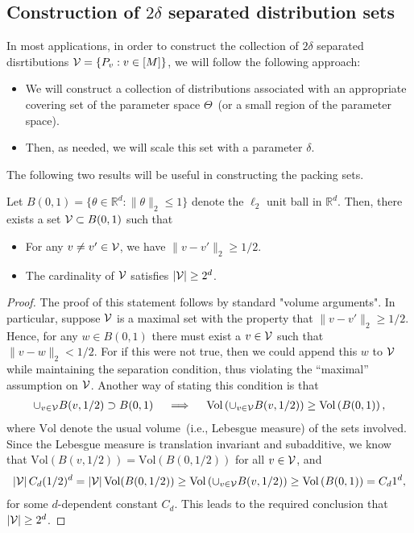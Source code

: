 \documentclass[12pt]{article}
\begin{document}
\subsection{Construction of $2\delta$ separated distribution sets}
\label{subsec:packing-sets}
In most applications, in order to construct the collection of $2\delta$ separated disrtibutions ${\cal V} = \{P_v: v \in [M]\}$, we will follow the following approach: 
\begin{itemize}
	\item We will construct a collection of distributions associated with an appropriate covering set of the parameter space $\Theta$~(or a small region of the parameter space). 
	\item Then, as needed, we will scale this set with a parameter $\delta$. 
\end{itemize}
The following two results will be useful in constructing the packing sets. 

\begin{lemma}
	\label{lemma:covering-euclidean} Let $B(0, 1) = \{\theta \in \mathbb{R}^d: \|\theta\|_2 \leq 1\}$ denote the $\ell_2$ unit ball  in $\mathbb{R}^d$. Then, there exists a set ${\cal V} \subset B(0, 1)$ such that 
	\begin{itemize}
		\item For any $v \neq v' \in {\cal V}$, we have $\|v - v'\|_2 \geq 1/2$. 
		\item The cardinality of ${\cal V}$ satisfies $|{\cal V}| \geq 2^d$. 
	\end{itemize}
\end{lemma}

\begin{proof}
	The proof of this statement follows by standard "volume arguments". In particular, suppose ${\cal V}$ is a maximal set with the property that $\|v-v'\|_2 \geq 1/2$. Hence, for any $w \in B(0, 1)$ there must exist a $v \in {\cal V}$ such that $\|v-w\|_2 < 1/2$. For if this were not true, then we could append this $w$ to ${\cal V}$ while maintaining the separation condition, thus violating the ``maximal'' assumption on ${\cal V}$. Another way of stating this condition is that 
	\begin{align}
		\cup_{v \in {\cal V}} B(v, 1/2) \supset B(0, 1) \quad \implies \quad \mathrm{Vol}\left( \cup_{v \in {\cal V}} B(v, 1/2)\right) \geq \mathrm{Vol}\left( B(0, 1) \right), 
	\end{align}
	where $\mathrm{Vol}$ denote the usual volume~(i.e., Lebesgue measure) of the sets involved. Since the Lebesgue measure is translation invariant and subadditive, we know that $\mathrm{Vol}(B(v, 1/2)) = \mathrm{Vol}(B(0, 1/2))$ for all $v \in {\cal V}$, and 
	\begin{align}
		|{\cal V}|\, C_d (1/2)^d =  |{\cal V}|\, \mathrm{Vol}(B(0,1/2)) \geq \mathrm{Vol}\left( \cup_{v \in {\cal V}} B(v, 1/2)\right) \geq \mathrm{Vol}\left( B(0, 1) \right) = C_d 1^d,
	\end{align}
	for some $d$-dependent constant $C_d$. This leads to the required conclusion that $|{\cal V}| \geq 2^d$. 
\end{proof}
\end{document}
